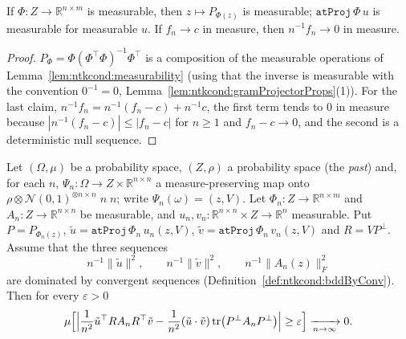 \begin{lemma}\label{lem:ntkcond:atProjMeasurable}
  \leanok
If $\Phi:Z\to\mathbb R^{n\times m}$ is measurable, then $z\mapsto P_{\Phi(z)}$ is measurable; $\texttt{atProj}\,\Phi\,u$ is measurable for measurable $u$. If $f_n\to c$ in measure, then $n^{-1}f_n\to0$ in measure.
\end{lemma}

\begin{proof}
  \leanok
$P_\Phi=\Phi(\Phi^\top\Phi)^{-1}\Phi^\top$ is a composition of the measurable operations of Lemma~\ref{lem:ntkcond:measurability} (using that the inverse is measurable with the convention $0^{-1}=0$, Lemma~\ref{lem:ntkcond:gramProjectorProps}(1)). For the last claim, $n^{-1}f_n=n^{-1}(f_n-c)+n^{-1}c$, the first term tends to $0$ in measure because $|n^{-1}(f_n-c)|\le|f_n-c|$ for $n\ge1$ and $f_n-c\to0$, and the second is a deterministic null sequence.
\end{proof}

\begin{theorem}\label{thm:ntkcond:residualQuad}
  \leanok
Let $(\Omega,\mu)$ be a probability space, $(Z,\rho)$ a probability space (the \emph{past}) and, for each $n$, $\Psi_n:\Omega\to Z\times\mathbb R^{n\times n}$ a measure-preserving map onto $\rho\otimes\mathcal N(0,1)^{\otimes n\times n}\;n\;n$; write $\Psi_n(\omega)=(z,V)$. Let $\Phi_n:Z\to\mathbb R^{n\times m}$ and $A_n:Z\to\mathbb R^{n\times n}$ be measurable, and $u_n,v_n:\mathbb R^{n\times n}\times Z\to\mathbb R^n$ measurable. Put $P=P_{\Phi_n(z)}$, $\tilde u=\texttt{atProj}\,\Phi_n\,u_n(z,V)$, $\tilde v=\texttt{atProj}\,\Phi_n\,v_n(z,V)$ and $R=VP^\perp$. Assume that the three sequences
\[
  n^{-1}\|\tilde u\|^2,\qquad n^{-1}\|\tilde v\|^2,\qquad n^{-1}\|A_n(z)\|_F^2
\]
are dominated by convergent sequences (Definition~\ref{def:ntkcond:bddByConv}). Then for every $\varepsilon>0$
\[
  \mu\Bigl[\Bigl|\frac1{n^2}\tilde u^\top RA_nR^\top\tilde v-\frac1{n^2}(\tilde u\cdot\tilde v)\operatorname{tr}\bigl(P^\perp A_nP^\perp\bigr)\Bigr|\ge\varepsilon\Bigr]\xrightarrow[n\to\infty]{}0 .
\]
\end{theorem}

